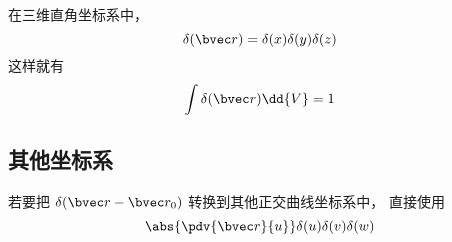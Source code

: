 
\begin{issues}
\issueDraft
\end{issues}


在三维直角坐标系中， 
\begin{equation}
\delta(\bvec r) = \delta(x)\delta(y)\delta(z)
\end{equation}
这样就有
\begin{equation}
\int \delta(\bvec r) \dd{V} = 1
\end{equation}

\subsection{其他坐标系}
若要把 $\delta(\bvec r - \bvec r_0)$ 转换到其他正交曲线坐标系中， 直接使用
\begin{equation}
\abs{\pdv{\bvec r}{u}}\delta(u)\delta(v)\delta(w)
\end{equation}

